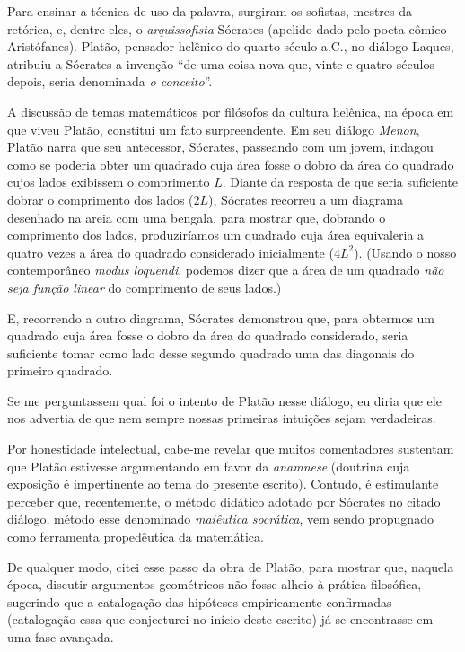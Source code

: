 \documentclass{hipatia}
\begin{document}
Para ensinar a técnica de uso da palavra, surgiram os sofistas, mestres da retórica, e, dentre eles, o \emph{arquissofista} Sócrates (apelido dado pelo poeta cômico Aristófanes).  Platão, pensador helênico do quarto século a.C., no diálogo Laques, atribuiu a Sócrates a invenção ``de uma coisa nova que, vinte e quatro séculos depois, seria denominada \emph{o conceito}''. \cite[p. 20]{chatelet1994}

A discussão de temas matemáticos por filósofos da cultura helênica, na época em que viveu Platão, constitui um fato surpreendente. Em seu diálogo \emph{Menon}, Platão narra que seu antecessor, Sócrates, passeando com um jovem, indagou como se poderia obter um quadrado cuja área fosse o dobro da área do quadrado cujos lados exibissem o comprimento $L$. Diante da resposta de que seria suficiente dobrar o comprimento dos lados  ($2L$), Sócrates recorreu a um diagrama desenhado na areia com uma bengala, para mostrar que, dobrando o comprimento dos lados,  produziríamos um quadrado cuja área equivaleria a quatro vezes a área do quadrado considerado inicialmente  ($4L^2$). (Usando o nosso contemporâneo \emph{modus loquendi}, podemos dizer que a área de um quadrado \emph{não seja função linear} do comprimento de seus lados.)

E, recorrendo a outro diagrama, Sócrates demonstrou que, para obtermos um quadrado cuja área fosse o dobro da área do quadrado considerado, seria suficiente tomar como lado desse segundo quadrado uma das diagonais do primeiro quadrado.

Se me perguntassem qual foi o intento de Platão nesse diálogo, eu diria que ele nos advertia de que nem sempre nossas primeiras intuições sejam verdadeiras. 

Por honestidade intelectual, cabe-me revelar que muitos comentadores sustentam que Platão estivesse argumentando em favor da \emph{anamnese}  (doutrina cuja exposição é impertinente ao tema do presente escrito). Contudo, é estimulante perceber que, recentemente, o método didático adotado por Sócrates no citado diálogo, método esse denominado \emph{maiêutica socrática}, vem sendo propugnado como ferramenta propedêutica da matemática. \cite[p. 8]{winter1989}

De qualquer modo, citei esse passo da obra de Platão, para mostrar que, naquela época, discutir argumentos geométricos não fosse alheio à prática filosófica, sugerindo que a catalogação das hipóteses empiricamente confirmadas  (catalogação essa que conjecturei no início deste escrito)  já se encontrasse em uma fase avançada.
\end{document}
